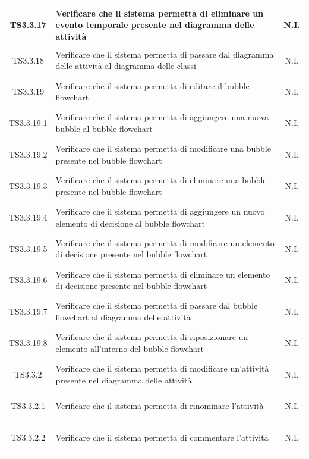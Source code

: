 \documentclass[../PianoDiQualifica.tex]{subfiles}
\begin{document}
\begin{longtable}{|c|>{\centering}p{10cm}|c|}
	\hline
	\hypertarget{TS3.3.17}{TS3.3.17} & Verificare che il sistema permetta di eliminare un evento temporale presente nel diagramma delle attività & N.I. \\
	\hline
	\hypertarget{TS3.3.18}{TS3.3.18} & Verificare che il sistema permetta di passare dal diagramma delle attività al diagramma delle classi & N.I. \\
	\hline
	\hypertarget{TS3.3.19}{TS3.3.19} & Verificare che il sistema permetta di editare il bubble flowchart & N.I. \\
	\hline
	\hypertarget{TS3.3.19.1}{TS3.3.19.1} & Verificare che il sistema permetta di aggiungere una nuova bubble al bubble flowchart & N.I. \\
	\hline
	\hypertarget{TS3.3.19.2}{TS3.3.19.2} & Verificare che il sistema permetta di modificare una bubble presente nel bubble flowchart & N.I. \\
	\hline
	\hypertarget{TS3.3.19.3}{TS3.3.19.3} & Verificare che il sistema permetta di eliminare una bubble presente nel bubble flowchart & N.I. \\
	\hline
	\hypertarget{TS3.3.19.4}{TS3.3.19.4} & Verificare che il sistema permetta di aggiungere un nuovo elemento di decisione al bubble flowchart & N.I. \\
	\hline
	\hypertarget{TS3.3.19.5}{TS3.3.19.5} & Verificare che il sistema permetta di modificare un elemento di decisione presente nel bubble flowchart & N.I. \\
	\hline
	\hypertarget{TS3.3.19.6}{TS3.3.19.6} & Verificare che il sistema permetta di eliminare un elemento di decisione presente nel bubble flowchart & N.I. \\
	\hline
	\hypertarget{TS3.3.19.7}{TS3.3.19.7} & Verificare che il sistema permetta di passare dal bubble flowchart al diagramma delle attività & N.I. \\
	\hline
	\hypertarget{TS3.3.19.8}{TS3.3.19.8} & Verificare che il sistema permetta di riposizionare un elemento all'interno del bubble flowchart & N.I. \\
	\hline
	\hypertarget{TS3.3.2}{TS3.3.2} & Verificare che il sistema permetta di modificare un'attività presente nel diagramma delle attività & N.I. \\
	\hline
	\hypertarget{TS3.3.2.1}{TS3.3.2.1} & Verificare che il sistema permetta di rinominare l'attività & N.I. \\
	\hline
	\hypertarget{TS3.3.2.2}{TS3.3.2.2} & Verificare che il sistema permetta di commentare l'attività & N.I. \\

\end{longtable}
\end{document}
